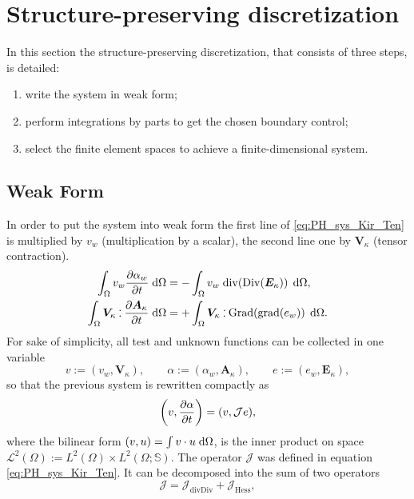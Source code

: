 \documentclass[letterpaper, 10 pt, conference]{ieeeconf}
\def\onedot{$\mathsurround0pt\ldotp$}
\def\cddot{%
	\mathbin{\vcenter{\baselineskip.67ex
			\hbox{\onedot}\hbox{\onedot}}%
}}
\begin{document}
\section{Structure-preserving discretization}
\label{sec:SP_discr}
In this section the structure-preserving discretization, that consists of three steps, is detailed: 
\begin{enumerate}
	\item write the system in weak form;
	\item perform integrations by parts to get the chosen boundary control;
	\item select the finite element spaces to achieve a finite-dimensional system.
\end{enumerate}


\subsection{Weak Form}
\label{subsec:WF}
In order to put the system into weak form the first line of \eqref{eq:PH_sys_Kir_Ten} is multiplied  by $v_w$ (multiplication by a scalar), the second line one by $\bm{V}_{\kappa}$ (tensor contraction).
\begin{align}
\int_{\Omega} v_w \diffp{\alpha_w}{t}  \d\Omega &=  -\int_{\Omega} v_w \; \mathrm{div}(\mathrm{Div}(\bm{E}_\kappa)) \, \d\Omega,  \label{eq:wf1_Kir_ten}\\
\int_{\Omega} \bm{V}_{\kappa} \cddot \diffp{\bm{A}_{\kappa}}{t}   \d\Omega &= +\int_{\Omega} \bm{V}_{\kappa} \cddot \mathrm{Grad}(\mathrm{grad}(e_w)) \, \d\Omega. \label{eq:wf2_Kir_ten} 
\end{align}
For sake of simplicity, all test and unknown functions can be collected in one variable
\begin{equation}
v := (v_{w}, \bm{V}_{\kappa}), \qquad \alpha := (\alpha_{w}, \bm{A}_{\kappa}), \qquad e := (e_{w}, \bm{E}_{\kappa}),
\end{equation}
so that the previous system is rewritten compactly as
\begin{equation}
\left(v, \diffp{\alpha}{t}\right) = (v, \mathcal{J}e),
\end{equation}
where the bilinear form $(v,u) = \int v \cdot u \d{\Omega}$, is the inner product on space $\mathscr{L}^2(\Omega) := L^2(\Omega) \times L^2(\Omega; \mathbb{S}) $. The operator $\mathcal{J}$ was defined in equation \eqref{eq:PH_sys_Kir_Ten}. It can be decomposed into the sum of two operators
\begin{equation}
\mathcal{J} = \mathcal{J}_{\mathrm{divDiv}} + \mathcal{J}_{\mathrm{Hess}}, 
\end{equation}
\end{document}
